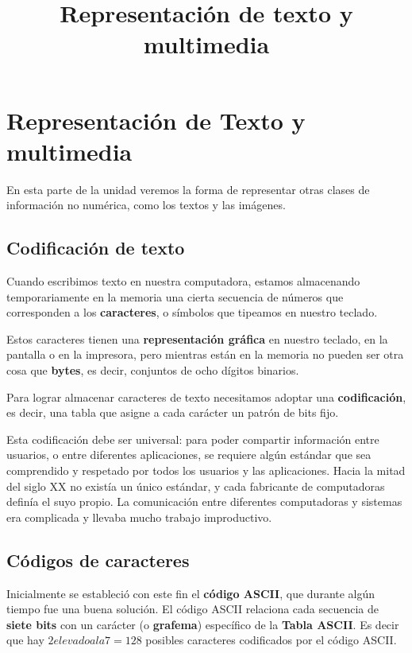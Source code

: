 \documentclass[spanish,A4,]{article}
\title{Representación de texto y multimedia}
\begin{document}
\maketitle

\section{Representación de Texto y
multimedia}\label{representaciuxf3n-de-texto-y-multimedia}

En esta parte de la unidad veremos la forma de representar otras clases
de información no numérica, como los textos y las imágenes.

\subsection{Codificación de texto}\label{codificaciuxf3n-de-texto}

Cuando escribimos texto en nuestra computadora, estamos almacenando
temporariamente en la memoria una cierta secuencia de números que
corresponden a los \textbf{caracteres}, o símbolos que tipeamos en
nuestro teclado.

Estos caracteres tienen una \textbf{representación gráfica} en nuestro
teclado, en la pantalla o en la impresora, pero mientras están en la
memoria no pueden ser otra cosa que \textbf{bytes}, es decir, conjuntos
de ocho dígitos binarios.

Para lograr almacenar caracteres de texto necesitamos adoptar una
\textbf{codificación}, es decir, una tabla que asigne a cada carácter un
patrón de bits fijo.

Esta codificación debe ser universal: para poder compartir información
entre usuarios, o entre diferentes aplicaciones, se requiere algún
estándar que sea comprendido y respetado por todos los usuarios y las
aplicaciones. Hacia la mitad del siglo XX no existía un único estándar,
y cada fabricante de computadoras definía el suyo propio. La
comunicación entre diferentes computadoras y sistemas era complicada y
llevaba mucho trabajo improductivo.

\subsection{Códigos de caracteres}\label{cuxf3digos-de-caracteres}

Inicialmente se estableció con este fin el \textbf{código ASCII}, que
durante algún tiempo fue una buena solución. El código ASCII relaciona
cada secuencia de \textbf{siete bits} con un carácter (o
\textbf{grafema}) específico de la \textbf{Tabla ASCII}. Es decir que
hay $2 elevado a la 7 = 128$ posibles caracteres codificados por el código ASCII.
\end{document}
